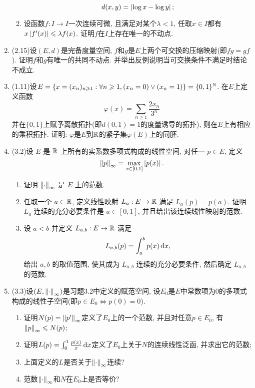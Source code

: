 \begin{enumerate}[label=\textbf{\arabic*.}, ref=\arabic*]
\begin{enumerate}[(1)]
			\[
			d(x,y)=\left| \log x-\log y \right| ;
			\]
		\item 设函数$ f : I\to I $一次连续可微, 且满足对某个$ \lambda<1 $, 任取$ x\in I $都有$ x\left| f'(x) \right| \leqslant\lambda f(x) $. 证明$ f $在$ I $上存在唯一的不动点. 
	\end{enumerate}
	\item (2.15)设$ (E,d) $是完备度量空间, $ f $和$ g $是$ E $上两个可交换的压缩映射(即$ fg=gf $). 证明$ f $和$ g $有唯一的共同不动点. 并举出反例说明当可交换条件不满足时结论不成立. 
	\item (1.11)设$ E=\{ x=(x_n)_{n\geqslant 1} : \forall n\geqslant 1, (x_n=0)\lor(x_n=1) \}=\{ 0,1 \}^{\mathbb{N}} $. 在$ E $上定义函数
		\[
		\varphi(x)=\sum_{n\geqslant 1}\frac{2x_n}{3^{n  }}
		\]
		并在$ \{ 0,1 \} $上赋予离散拓扑(即$ d(0,1)=1 $的度量诱导的拓扑), 则在$ E $上有相应的乘积拓扑. 证明: $ \varphi $是$ E $到$ \mathbb{R} $的紧子集$ \varphi(E) $上的同胚. 
	\item (3.2)设 $ E $ 是 $ \mathbb{R} $ 上所有的实系数多项式构成的线性空间, 对任一 $ p\in E $, 定义
		\[
			\left\| p \right\|_{\infty}=\max_{x\in[0, 1]}\left| p(x) \right| .
		\]
		\begin{enumerate}[(1)]
			\item 证明 $ \left\| \cdot \right\|_{\infty} $ 是 $ E $ 上的范数.
			\item 任取一个 $ a\in\mathbb{R} $, 定义线性映射 $ L_{a}:E\to \mathbb{R} $ 满足 $ L_{a}(p)=p(a) $. 证明 $ L_{a} $ 连续的充分必要条件是 $ a\in[0, 1] $, 并且给出该连续线性映射的范数.
			\item 设 $ a<b $ 并定义 $ L_{a, b}:E\to \mathbb{R} $ 满足
			\[
				L_{a, b}(p)=\int_{a}^{b}p(x)\,\mathrm{d} x,
			\]
			给出 $ a, b $ 的取值范围, 使其成为 $ L_{a, b} $ 连续的充分必要条件, 然后确定 $ L_{a, b} $ 的范数. 
		\end{enumerate}
	\item (3.3)设$ (E,\left\| \cdot \right\|_\infty) $是习题3.2中定义的赋范空间, 设$ E_0 $是$ E $中常数项为0的多项式构成的线性子空间(即$ p\in E_0\Longleftrightarrow p(0)=0 $).
		\begin{enumerate}[(1)]
		\item 证明$ N(p)=\left\| p' \right\|_\infty $定义了$ E_0 $上的一个范数, 并且对任意$ p\in E_0 $, 有$ \left\| p \right\|_\infty\leqslant N(p) $;
		\item 证明$ L(p)=\int_0^1\frac{p(x)}{x}\,\mathrm{d} x $定义了$ E_0 $上关于$ N $的连续线性泛函, 并求出它的范数;
		\item 上面定义的$ L $是否关于$ \left\| \cdot \right\|_\infty $连续?
		\item 范数$ \left\| \cdot \right\|_\infty $和$ N $在$ E_0 $上是否等价? 
		\end{enumerate}

\end{enumerate}
